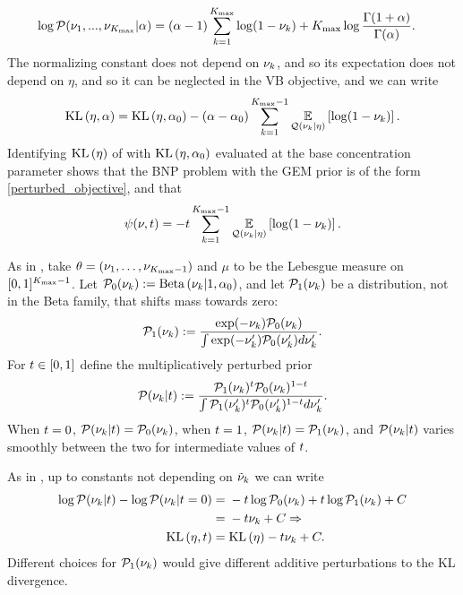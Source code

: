 \begin{ex}
\begin{align*}
%
\log \p(\nu_1, ..., \nu_\kmax \vert \alpha)
    ={}& (\alpha - 1) \sum_{k=1}^\kmax \log (1 - \nuk)
    + \kmax \log \frac{\Gamma(1 + \alpha)}{\Gamma(\alpha)}.
%
\end{align*}
%
The normalizing constant does not depend on $\nu_{k}$, and so its expectation
does not depend on $\eta$, and so it can be neglected in the VB objective,
and we can write
%
\begin{align*}
%
\KL{\eta, \alpha} = \KL{\eta, \alpha_0}
-(\alpha - \alpha_0) \sum_{\k=1}^{\kmax - 1}
    \expect{\q(\nuk \vert \eta)}{\log (1 - \nuk)}.
%
\end{align*}
%
Identifying $\mathrm{KL}\left(\eta\right)$ of  with $\mathrm{KL}\left(\eta, \alpha_0\right)$ evaluated
at the base concentration parameter shows that the BNP problem with the GEM
prior is of the form \eqref{perturbed_objective}, and that
%
\begin{align*}
%
\psi(\nu, \t) = -\t \sum_{\k=1}^{\kmax - 1}
    \expect{\q(\nuk \vert \eta)}{\log (1 - \nuk)}.
%
\end{align*}
%
\end{ex}



\begin{ex}
%
As in , take $\theta = (\nu_1, \ldots, \nu_{{K_{\mathrm{max}}}-1})$
and $\mu$ to be the Lebesgue measure on $[0,1]^{{K_{\mathrm{max}}}-1}$. Let $\mathcal{P}_{0}(\nu_{k}) :=
\mathrm{Beta}\left(\nu_{k} \vert 1, \alpha_0\right)$, and let $\mathcal{P}_{1}(\nu_{k})$ be a distribution, not
in the Beta family, that shifts mass towards zero:
%
\begin{align*}
%
\palt(\nuk) :=
    \frac{\exp(-\nuk)\pbase(\nuk)}{\int \exp(-\nuk')\pbase(\nuk') d\nuk'}.
%
\end{align*}
%
For $t \in [0,1]$ define the multiplicatively perturbed prior
%
\begin{align*}
%
\p(\nuk \vert \t) :=
    \frac{\palt(\nuk)^{\t} \pbase(\nuk)^{1-\t}}
         {\int \palt(\nuk')^{\t} \pbase(\nuk')^{1-\t} d\nuk'}.
%
\end{align*}
%
When $t = 0$, $\mathcal{P}(\nu_{k} \vert t) = \mathcal{P}_{0}(\nu_{k})$, when $t = 1$,
$\mathcal{P}(\nu_{k} \vert t)  = \mathcal{P}_{1}(\nu_{k})$, and $\mathcal{P}(\nu_{k} \vert t)$ varies smoothly
between the two for intermediate values of $t$.

As in , up to constants not depending on
$\tilde{\nu}_{k}$ we can write
%
\begin{align*}
%
\log \p(\nuk \vert \t) - \log \p(\nuk \vert \t=0) ={}&
    -\t \log \pbase(\nuk) + \t \log \palt(\nuk) + \const
\\={}& -\t \nuk + \const \Rightarrow
\\
\KL{\eta, \t} ={}& \KL{\eta} -\t \nuk + \const.
%
\end{align*}
%
Different choices for $\mathcal{P}_{1}(\nu_{k})$ would give different additive
perturbations to the KL divergence.
%
\end{ex}
%
